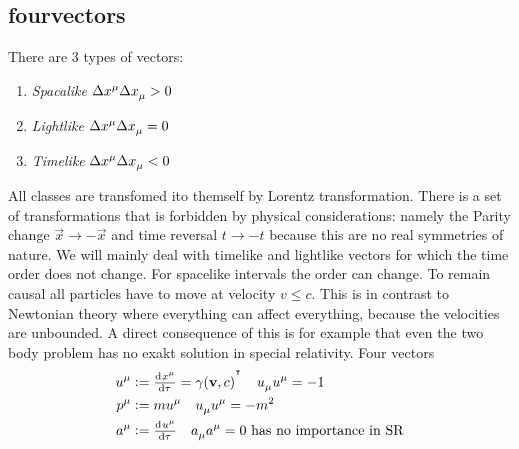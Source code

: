 \subsection{fourvectors}
There are 3 types of vectors:
\begin{enumerate}
    \item \emph{Spacalike} $\Delta\tensor{x}{^\mu}\Delta\tensor{x}{_\mu}>0$
    \item \emph{Lightlike} $\Delta\tensor{x}{^\mu}\Delta\tensor{x}{_\mu}=0$
    \item \emph{Timelike} $\Delta\tensor{x}{^\mu}\Delta\tensor{x}{_\mu}<0$
\end{enumerate}
All classes are transfomed ito themself by Lorentz transformation. There is a
set of transformations that is forbidden by physical considerations: namely the
Parity change $\vec{x}\to -\vec{x}$ and time reversal $t\to -t$ because this are
no real symmetries of nature.
We will mainly deal with timelike and lightlike vectors for which the time order
does not change. For spacelike intervals the order can change. To remain causal
all particles have to move at velocity $v\leq c$. This is in contrast to
Newtonian theory where everything can affect everything, because the velocities
are unbounded. A direct consequence of this is for example that even the two
body problem has no exakt solution in special relativity.
Four vectors
\begin{align}
    \tensor{u}{^\mu}&:=\od{\tensor{x}{^\mu}}{\tau}=\gamma(\vec{v},c)^{\transpose}\quad
    \tensor{u}{_\mu}\tensor{u}{^\mu}=-1\\
    \tensor{p}{^\mu}&:=m\tensor{u}{^\mu}\quad
    \tensor{u}{_\mu}\tensor{u}{^\mu}=-m^2\\
    \tensor{a}{^\mu}&:=\od{\tensor{u}{^\mu}}{\tau}\quad
    \tensor{a}{_\mu}\tensor{a}{^\mu}=0 \text{ has no importance in SR}
\end{align}
